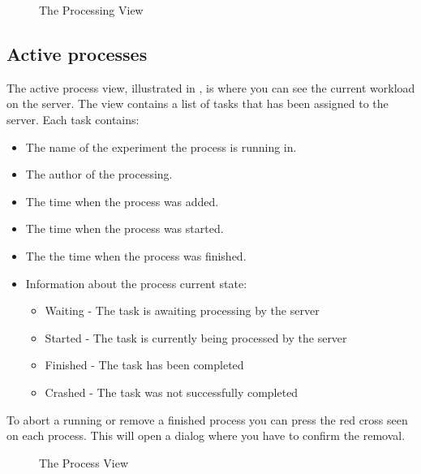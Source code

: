 \begin{figure}[h]
\caption{The Processing View}
\label{fig:and_processing_man}
\end{figure}

\FloatBarrier


\subsection{Active processes}
The active process view, illustrated in , is where you can see the current workload on the server. The view contains a list of tasks that has been assigned to the server. Each task contains:
\begin{itemize}
\item The name of the experiment the process is running in.
\item The author of the processing.
\item The time when the process was added.
\item The time when the process was started.
\item The the time when the process was finished. 
\item Information about the process current state:
\begin{itemize}
\item Waiting  - The task is awaiting processing by the server
\item Started  - The task is currently being processed by the server
\item Finished - The task has been completed
\item Crashed - The task was not successfully completed
\end{itemize}
\end{itemize}

To abort a running or remove a finished process you can press the red cross seen on each process. This will open a dialog where you have to confirm the removal.


\begin{figure}[h]
\caption{ The Process View}
\label{fig:and_process_man}
\end{figure}

\FloatBarrier
